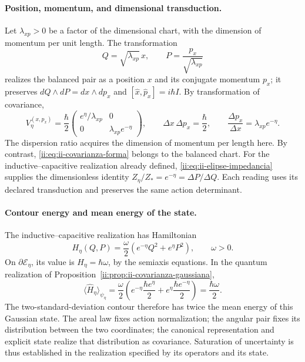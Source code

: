 \paragraph{Position, momentum, and dimensional transduction.}
Let \(\lambda_{xp}>0\) be a factor of the dimensional chart, with the dimension of momentum per unit length. The transformation
\[
 Q=\sqrt{\lambda_{xp}}\,x,\qquad
 P=\frac{p_x}{\sqrt{\lambda_{xp}}}
\]
realizes the balanced pair as a position \(x\) and its conjugate momentum
\(p_x\); it preserves \(dQ\wedge dP=dx\wedge dp_x\) and
\([\widehat x,\widehat p_x]=i\hbar I\). By transformation of
covariance,
\begin{equation}
 V_\eta^{(x,p_x)}=\frac{\hbar}{2}
 \begin{pmatrix}e^\eta/\lambda_{xp}&0\\
                 0&\lambda_{xp}e^{-\eta}\end{pmatrix},\qquad
 \Delta x\,\Delta p_x=\frac{\hbar}{2},\qquad
 \frac{\Delta p_x}{\Delta x}=\lambda_{xp}e^{-\eta}.
 \label{ii:eq:ii-covarianza-dimensiones}
\end{equation}
The dispersion ratio acquires the dimension of momentum per length here. By contrast, \eqref{ii:eq:ii-covarianza-forma} belongs to the balanced chart. For the inductive--capacitive realization already defined, \eqref{ii:eq:ii-elipse-impedancia} supplies the dimensionless identity \(Z_\eta/Z_*=e^{-\eta}=\Delta P/\Delta Q\). Each reading uses its declared transduction and preserves the same action determinant.

\paragraph{Contour energy and mean energy of the state.}
The inductive--capacitive realization has Hamiltonian
\[
 H_\eta(Q,P)=\frac{\omega}{2}
 \left(e^{-\eta}Q^2+e^\eta P^2\right),\qquad \omega>0.
\]
On \(\partial\mathcal E_\eta\), its value is
\(H_\eta=\hbar\omega\), by the semiaxis equations. In the
quantum realization of Proposition~\ref{ii:prop:ii-covarianza-gaussiana},
\begin{equation}
 \langle\widehat H_\eta\rangle_{\psi_\eta}
 =\frac{\omega}{2}
 \left(e^{-\eta}\frac{\hbar e^\eta}{2}
       +e^\eta\frac{\hbar e^{-\eta}}{2}\right)
 =\frac{\hbar\omega}{2}.
 \label{ii:eq:ii-energia-contorno-covarianza}
\end{equation}
The two-standard-deviation contour therefore has twice the
mean energy of this Gaussian state. The areal law fixes action
normalization; the angular pair fixes its distribution between the two coordinates;
the canonical representation and explicit state realize that distribution
as covariance. Saturation of uncertainty is thus established in
the realization specified by its operators and its state.
